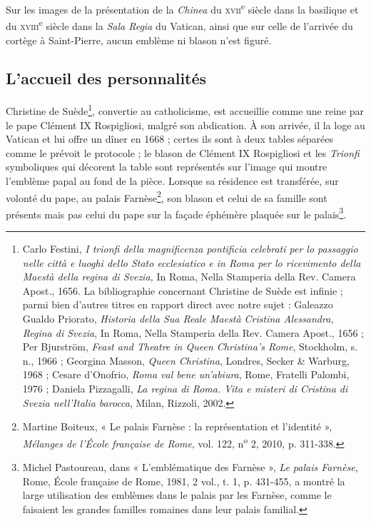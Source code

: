 \documentclass[12pt,twoside,openany]{book}
\begin{document}
Sur les images de la présentation de la \textit{Chinea} du \textsc{xvii}\textsuperscript{e} siècle dans la basilique et du \textsc{xviii}\textsuperscript{e} siècle dans la \textit{Sala Regia} du Vatican, ainsi que sur celle de l’arrivée du cortège à Saint-Pierre, aucun emblème ni blason n’est figuré.

\subsection{L’accueil des personnalités}

Christine de Suède\footnote{Carlo Festini, \textit{I trionfi della magnificenza pontificia celebrati per lo passaggio nelle città e luoghi dello Stato ecclesiatico e in Roma per lo ricevimento della Maestà della regina di Svezia, }In Roma, Nella Stamperia della Rev. Camera Apost., 1656. La bibliographie concernant Christine de Suède est infinie ; parmi bien d’autres titres en rapport direct avec notre sujet : Galeazzo Gualdo Priorato, \textit{Historia della Sua Reale Maestà Cristina Alessandra, Regina di Svezia}, In Roma, Nella Stamperia della Rev. Camera Apost., 1656 ; Per Bjurström, \textit{Feast and Theatre in Queen Christina’s Rome}, Stockholm, s. n., 1966 ; Georgina Masson, \textit{Queen Christina}, Londres, Secker \& Warburg, 1968 ; Cesare d’Onofrio, \textit{Roma val bene un’abiura}, Rome, Fratelli Palombi, 1976 ; Daniela Pizzagalli, \textit{La regina di Roma. Vita e misteri di Cristina di Svezia nell’Italia barocca}, Milan, Rizzoli, 2002.}, convertie au catholicisme, est accueillie comme une reine par le pape Clément IX Rospigliosi, malgré son abdication. À son arrivée, il la loge au Vatican et lui offre un dîner en 1668 ; certes ils sont à deux tables séparées comme le prévoit le protocole ; le blason de Clément IX Rospigliosi et les \textit{Trionfi} symboliques qui décorent la table sont représentés sur l’image qui montre l’emblème papal au fond de la pièce. Lorsque sa résidence est transférée, sur volonté du pape, au palais Farnèse\footnote{Martine Boiteux, « Le palais Farnèse : la représentation et l’identité », \textit{Mélanges de l’École française de Rome}, vol. 122, n\textsuperscript{o} 2, 2010, p. 311-338.}, son blason et celui de sa famille sont présents mais pas celui du pape sur la façade éphémère plaquée sur le palais\footnote{Michel Pastoureau, dans « L’emblématique des Farnèse », \textit{Le palais Farnèse}, Rome, École française de Rome, 1981, 2 vol., t. 1, p. 431-455, a montré la large utilisation des emblèmes dans le palais par les Farnèse, comme le faisaient les grandes familles romaines dans leur palais familial.}.
\end{document}
